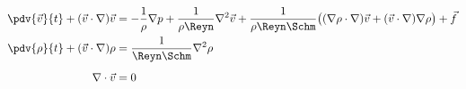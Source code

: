 \begin{subequations}\label{eq:vdinse_nd}
\begin{align}
    \pdv{\vec{v}}{t} + (\vec{v} \cdot \nabla)\vec{v} &=
        - \frac{1}{\rho} \nabla{p}
        + \frac{1}{\rho\Reyn} \nabla^2 \vec{v}
        + \frac{1}{\rho\Reyn\Schm} \big(
              (\nabla{\rho} \cdot \nabla)\vec{v}
            + (\vec{v} \cdot \nabla)\nabla\rho
          \big)
        + \vec{f}
    \label{eq:vdinse_nd_momentum}
    \\
    \pdv{\rho}{t} + (\vec{v} \cdot \nabla)\rho &=
          \frac{1}{\Reyn\Schm} \nabla^2 \rho
    \label{eq:vdinse_nd_mass}
    \\
    \nabla \cdot \vec{v} &= 0 \vphantom{\frac{1}{\Re}}
    \label{eq:vdinse_nd_incompressibility}
\end{align}
\end{subequations}
